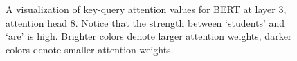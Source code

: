\documentclass[
  12pt,
  letterpaper,
]{scrreprt}
\begin{document}
\begin{figure}[htbp]

\caption{\label{fig-attentionplot}A visualization of key-query attention
values for BERT at layer 3, attention head 8. Notice that the strength
between `students' and `are' is high. Brighter colors denote larger
attention weights, darker colors denote smaller attention weights.}


\end{figure}%
\end{document}
